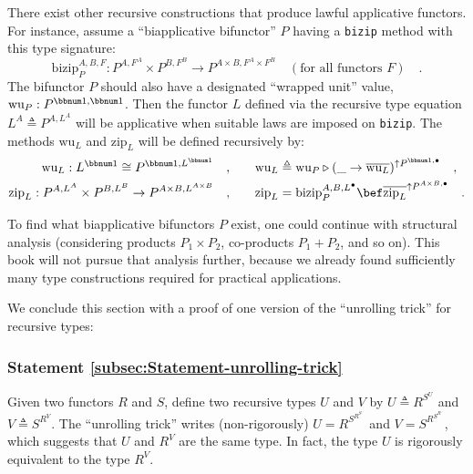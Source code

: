 There  exist other recursive constructions that produce lawful applicative
functors. For instance, assume a \textsf{``}biapplicative bifunctor\textsf{''} $P$
having a \lstinline!bizip! method with this type signature: 
\[
\text{bizip}_{P}^{A,B,F}:P^{A,F^{A}}\times P^{B,F^{B}}\rightarrow P^{A\times B,F^{A}\times F^{B}}\quad(\text{for all functors }F)\quad.
\]
The bifunctor $P$ should also have a designated \textsf{``}wrapped unit\textsf{''}
value, $\text{wu}_{P}:P^{\bbnum 1,\bbnum 1}$. Then the functor $L$
defined via the recursive type equation $L^{A}\triangleq P^{A,L^{A}}$
will be applicative when suitable laws are imposed on \lstinline!bizip!.
The methods $\text{wu}_{L}$ and $\text{zip}_{L}$ will be defined
recursively by:
\begin{align*}
\text{wu}_{L}:L^{\bbnum 1}\cong P^{\bbnum 1,L^{\bbnum 1}}\quad, & \quad\quad\text{wu}_{L}\triangleq\text{wu}_{P}\triangleright(\_\rightarrow\overline{\text{wu}_{L}})^{\uparrow P^{\bbnum 1,\bullet}}\quad,\\
\text{zip}_{L}:P^{A,L^{A}}\times P^{B,L^{B}}\rightarrow P^{A\times B,L^{A\times B}}\quad, & \quad\quad\text{zip}_{L}=\text{bizip}_{P}^{A,B,L^{\bullet}}\bef\overline{\text{zip}_{L}}^{\uparrow P^{A\times B,\bullet}}\quad.
\end{align*}

To find what biapplicative bifunctors $P$ exist, one could continue
with structural analysis (considering products $P_{1}\times P_{2}$,
co-products $P_{1}+P_{2}$, and so on). This book will not pursue
that analysis further, because we already found sufficiently many
type constructions required for practical applications.

We conclude this section with a proof of one version of the \textsf{``}unrolling
trick\textsf{''} for recursive types:

\subsubsection{Statement \label{subsec:Statement-unrolling-trick}\ref{subsec:Statement-unrolling-trick}}

Given two functors $R$ and $S$, define two recursive types $U$
and $V$ by $U\triangleq R^{S^{U}}$ and $V\triangleq S^{R^{V}}$.
The \textsf{``}unrolling trick\textsf{''} writes (non-rigorously) $U=R^{S^{R^{S^{\iddots}}}}\!$
and $V=S^{R^{S^{R^{\iddots}}}}\!$, which suggests that $U$ and $R^{V}$
are the same type. In fact, the type $U$ is rigorously equivalent
to the type $R^{V}$.


